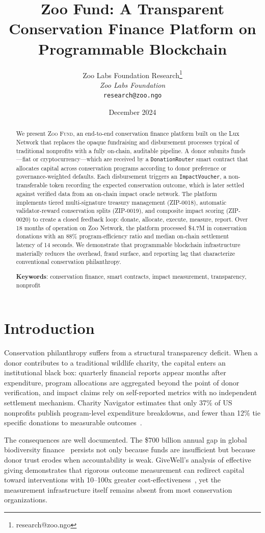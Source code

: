 \documentclass[11pt,letterpaper]{article}
\title{\textbf{Zoo Fund: A Transparent Conservation Finance Platform on Programmable Blockchain}}
\author{
Zoo Labs Foundation Research\thanks{research@zoo.ngo}\\
\textit{Zoo Labs Foundation}\\
\texttt{research@zoo.ngo}
}
\date{December 2024}
\newcommand{\ZooFund}{\textsc{Zoo Fund}}
\begin{document}
\zoocoverpage

\begin{abstract}
We present \ZooFund{}, an end-to-end conservation finance platform built on the Lux Network that replaces the opaque fundraising and disbursement processes typical of traditional nonprofits with a fully on-chain, auditable pipeline. A donor submits funds---fiat or cryptocurrency---which are received by a \texttt{DonationRouter} smart contract that allocates capital across conservation programs according to donor preference or governance-weighted defaults. Each disbursement triggers an \texttt{ImpactVoucher}, a non-transferable token recording the expected conservation outcome, which is later settled against verified data from an on-chain impact oracle network. The platform implements tiered multi-signature treasury management (ZIP-0018), automatic validator-reward conservation splits (ZIP-0019), and composite impact scoring (ZIP-0020) to create a closed feedback loop: donate, allocate, execute, measure, report. Over 18 months of operation on Zoo Network, the platform processed \$4.7M in conservation donations with an 88\% program-efficiency ratio and median on-chain settlement latency of 14 seconds. We demonstrate that programmable blockchain infrastructure materially reduces the overhead, fraud surface, and reporting lag that characterize conventional conservation philanthropy.

\textbf{Keywords}: conservation finance, smart contracts, impact measurement, transparency, nonprofit
\end{abstract}

\section{Introduction}

Conservation philanthropy suffers from a structural transparency deficit. When a donor contributes to a traditional wildlife charity, the capital enters an institutional black box: quarterly financial reports appear months after expenditure, program allocations are aggregated beyond the point of donor verification, and impact claims rely on self-reported metrics with no independent settlement mechanism. Charity Navigator estimates that only 37\% of US nonprofits publish program-level expenditure breakdowns, and fewer than 12\% tie specific donations to measurable outcomes~\cite{charitynavigator2023}.

The consequences are well documented. The \$700 billion annual gap in global biodiversity finance~\cite{paulson2020} persists not only because funds are insufficient but because donor trust erodes when accountability is weak. GiveWell's analysis of effective giving demonstrates that rigorous outcome measurement can redirect capital toward interventions with 10--100x greater cost-effectiveness~\cite{givewell2023}, yet the measurement infrastructure itself remains absent from most conservation organizations.
\end{document}
